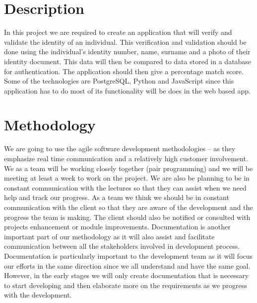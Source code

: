 \documentclass[runningheads,a4paper]{article}
\begin{document}
	\section{Description} %
	In this project we are required to create an application that will verify and validate the identity of an individual. This verification and validation should be done using the individual’s identity number, name, surname and a photo of their identity document. This data will then be compared to data stored in a database for authentication. The application should then give a percentage match score. \\
Some of the technologies are PostgreSQL, Python and JavaScript since this application has to do most of its functionality will be does in the web based app.\\

  \section{Methodology} %
  We are going to use the agile software development methodologies – as they emphasize real time communication and a relatively high customer involvement. We as a team will be working closely together (pair programming) and we will be meeting at least a week to work on the project.  We are also be planning to be in constant communication with the lectures so that they can assist when we need help and track our progress. 
As a team we think we should be in constant communication with the client so that they are aware of the development and the progress the team is making. The client should also be notified or consulted with projects enhancement or module improvements.
Documentation is another important part of our methodology as it will also assist and facilitate communication between all the stakeholders involved in development process. Documentation is particularly important to the development team as it will focus our efforts in the same direction since we all understand and have the same goal. However, in the early stages we will only create documentation that is necessary to start developing and then elaborate more on the requirements as we progress with the development.
\\
\end{document}
